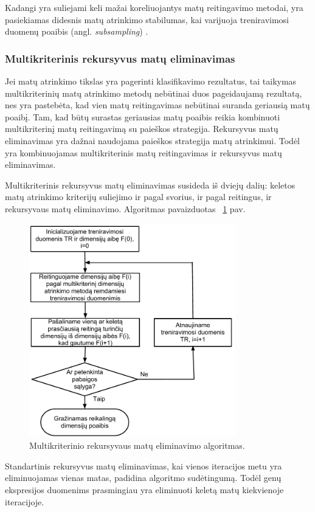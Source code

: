 Kadangi yra suliejami keli mažai koreliuojantys matų reitingavimo metodai, yra pasiekiamas didesnis matų atrinkimo stabilumas, kai varijuoja treniravimosi duomenų poaibis (angl. \textit{subsampling}) \cite{yang2011robust}.

\subsubsection{Multikriterinis rekursyvus matų eliminavimas}

Jei matų atrinkimo tikslas yra pagerinti klasifikavimo rezultatus, tai taikymas multikriterinių matų atrinkimo metodų nebūtinai duos pageidaujamą rezultatą, nes yra pastebėta, kad vien matų reitingavimas nebūtinai suranda geriausią matų poaibį. Tam, kad būtų surastas geriausias matų poaibis reikia kombinuoti multikriterinį matų reitingavimą su paieškos strategija. Rekursyvus matų eliminavimas yra dažnai naudojama paieškos strategija matų atrinkimui. Todėl yra kombinuojamas multikriterinis matų reitingavimas ir rekursyvus matų eliminavimas.

Multikriterinis rekursyvus matų eliminavimas\cite{yang2011robust} susideda iš dviejų dalių: keletos matų atrinkimo kriterijų suliejimo ir pagal svorius, ir 
pagal reitingus, ir rekursyvaus matų eliminavimo. Algoritmas pavaizduotas ~\ref{fig:figure6} pav.
\begin{figure}
 \centering
 \includegraphics[width=0.8\textwidth]{../bachelor/images/mcf-rfe_procedure.pdf}
 \caption{Multikriterinio rekursyvaus matų eliminavimo algoritmas.}
 \label{fig:figure6}
\end{figure}
Standartinis rekursyvus matų eliminavimas, kai vienos iteracijos metu yra eliminuojamas vienas matas, padidina algoritmo sudėtingumą. Todėl genų ekspresijos duomenims prasmingiau yra eliminuoti keletą matų kiekvienoje iteracijoje.

